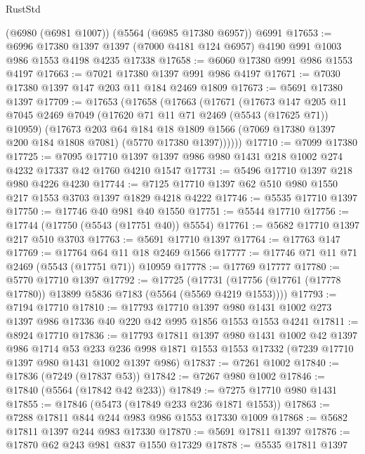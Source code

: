 \begin{lexlean}{RustStd}
\begin{coremodule}
    (@6980 (@6981 @1007))
    (@5564 (@6985 @17380 @6957))
    @6991
@17653 := @6996
    @17380
    @1397
    @1397
    (@7000 @4181 @124 @6957)
    @4190
    @991
    @1003
    @986
    @1553
    @4198
    @4235
    @17338
@17658 := @6060 @17380 @991 @986 @1553 @4197
@17663 := @7021 @17380 @1397 @991 @986 @4197
@17671 := @7030 @17380 @1397 @147 @203 @11 @184 @2469 @1809
@17673 := @5691 @17380 @1397
@17709 := @17653
    (@17658
      (@17663
        (@17671
          (@17673
            @147
            @205
            @11
            @7045
            @2469
            @7049
            (@17620 @71 @11 @71 @2469 (@5543 (@17625 @71)) @10959)
            (@17673
              @203
              @64
              @184
              @18
              @1809
              @1566
              (@7069 @17380 @1397 @200 @184 @1808 @7081)
              (@5770 @17380 @1397))))))
@17710 := @7099 @17380
@17725 := @7095
    @17710
    @1397
    @1397
    @986
    @980
    @1431
    @218
    @1002
    @274
    @4232
    @17337
    @42
    @1760
    @4210
    @1547
@17731 := @5496 @17710 @1397 @218 @980 @4226 @4230
@17744 := @7125 @17710 @1397 @62 @510 @980 @1550 @217 @1553 @3703 @1397 @1829 @4218 @4222
@17746 := @5535 @17710 @1397
@17750 := @17746 @40 @981 @40 @1550
@17751 := @5544 @17710
@17756 := @17744 (@17750 (@5543 (@17751 @40)) @5554)
@17761 := @5682 @17710 @1397 @217 @510 @3703
@17763 := @5691 @17710 @1397
@17764 := @17763 @147
@17769 := @17764 @64 @11 @18 @2469 @1566
@17777 := @17746 @71 @11 @71 @2469 (@5543 (@17751 @71)) @10959
@17778 := @17769 @17777
@17780 := @5770 @17710 @1397
@17792 := @17725
    (@17731 (@17756 (@17761 (@17778 @17780)) @13899 @5836 @7183 (@5564 (@5569 @4219 @1553))))
@17793 := @7194 @17710
@17810 := @17793
    @17710
    @1397
    @980
    @1431
    @1002
    @273
    @1397
    @986
    @17336
    @40
    @220
    @42
    @995
    @1856
    @1553
    @1553
    @4241
@17811 := @8924 @17710
@17836 := @17793
    @17811
    @1397
    @980
    @1431
    @1002
    @42
    @1397
    @986
    @1714
    @53
    @233
    @236
    @998
    @1871
    @1553
    @1553
    @17332
    (@7239 @17710 @1397 @980 @1431 @1002 @1397 @986)
@17837 := @7261 @1002
@17840 := @17836 (@7249 (@17837 @53))
@17842 := @7267 @980 @1002
@17846 := @17840 (@5564 (@17842 @42 @233))
@17849 := @7275 @17710 @980 @1431
@17855 := @17846 (@5473 (@17849 @233 @236 @1871 @1553))
@17863 := @7288 @17811 @844 @244 @983 @986 @1553 @17330 @1009
@17868 := @5682 @17811 @1397 @244 @983 @17330
@17870 := @5691 @17811 @1397
@17876 := @17870 @62 @243 @981 @837 @1550 @17329
@17878 := @5535 @17811 @1397

\end{coremodule}
\end{lexlean}

